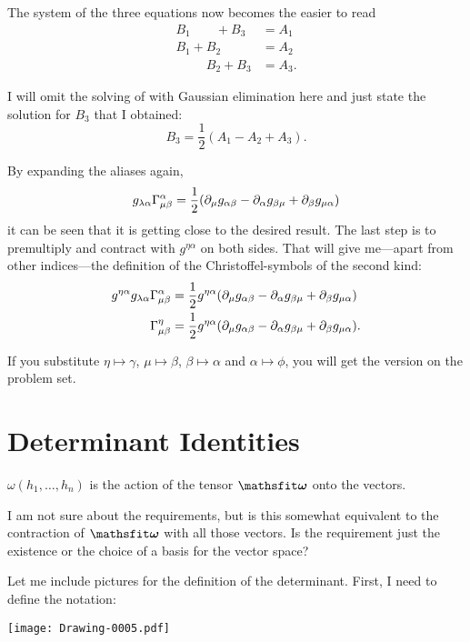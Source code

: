 The system of the three equations now becomes the easier to read
\begin{align*}
    B_1 \phantom{+B_2} + B_3 &= A_1 \\
    B_1 + B_2 \phantom{+ B_3} &= A_2 \\
    \phantom{B_1 +} B_2 + B_3 &= A_3.
\end{align*}

I will omit the solving of with Gaussian elimination here and just state the
solution for $B_3$ that I obtained:
\[
    B_3 = \frac12 (A_1 - A_2 + A_3).
\]

By expanding the aliases again,
\[
    g_{\lambda\alpha} \Gamma^{\alpha}_{{\mu}{\beta}} = \frac12 (\partial_\mu g_{\alpha\beta} - \partial_\alpha g_{\beta\mu} + \partial_\beta g_{\mu\alpha})
\]
it can be seen that it is getting close to the desired result. The last step is
to premultiply and contract with $g^{\eta\alpha}$ on both sides. That will give
me—apart from other indices—the definition of the Christoffel-symbols of the
second kind:
\begin{align*}
    g^{\eta\alpha} g_{\lambda\alpha} \Gamma^{\alpha}_{{\mu}{\beta}} &= \frac12
    g^{\eta\alpha} (\partial_\mu g_{\alpha\beta} - \partial_\alpha g_{\beta\mu}
    + \partial_\beta g_{\mu\alpha}) \\ 
    \Gamma^{\eta}_{{\mu}{\beta}} &= \frac12
    g^{\eta\alpha} (\partial_\mu g_{\alpha\beta} - \partial_\alpha g_{\beta\mu}
    + \partial_\beta g_{\mu\alpha}).
\end{align*}

If you substitute $\eta\mapsto\gamma$, $\mu\mapsto\beta$, $\beta\mapsto\alpha$
and $\alpha\mapsto\phi$, you will get the version on the problem set.

\section{Determinant Identities}

\begin{aside}
    $\omega(h_1, \ldots, h_n)$ is the action of the tensor $\tens \omega$ onto
    the vectors.

    I am not sure about the requirements, but is this somewhat equivalent to
    the contraction of $\tens \omega$ with all those vectors. Is the
    requirement just the existence or the choice of a basis for the vector
    space?
\end{aside}

Let me include pictures for the definition of the determinant. First, I need to
define the notation:
\begin{center}
    \texttt{[image: Drawing-0005.pdf]}
\end{center}

